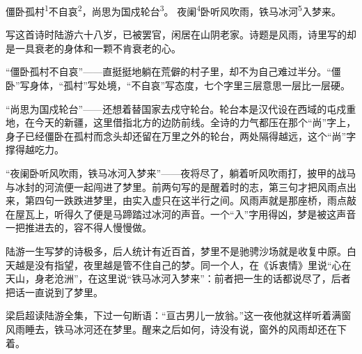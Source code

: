 
\begin{poem}
僵卧孤村\textsuperscript{1}不自哀\textsuperscript{2}，尚思为国戍轮台\textsuperscript{3}。
夜阑\textsuperscript{4}卧听风吹雨，铁马冰河\textsuperscript{5}入梦来。
\end{poem}

\begin{annotations}
\end{annotations}

\begin{appreciation}
写这首诗时陆游六十八岁，已被罢官，闲居在山阴老家。诗题是风雨，诗里写的却是一具衰老的身体和一颗不肯衰老的心。

“僵卧孤村不自哀”——直挺挺地躺在荒僻的村子里，却不为自己难过半分。“僵卧”写身体，“孤村”写处境，“不自哀”写态度，七个字里三层意思一层比一层硬。

“尚思为国戍轮台”——还想着替国家去戍守轮台。轮台本是汉代设在西域的屯戍重地，在今天的新疆，这里借指北方的边防前线。全诗的力气都压在那个“尚”字上，身子已经僵卧在孤村而念头却还留在万里之外的轮台，两处隔得越远，这个“尚”字撑得越吃力。

“夜阑卧听风吹雨，铁马冰河入梦来”——夜将尽了，躺着听风吹雨打，披甲的战马与冰封的河流便一起闯进了梦里。前两句写的是醒着时的志，第三句才把风雨点出来，第四句一跌跌进梦里，由实入虚只在这半行之间。风雨声就是那座桥，雨点敲在屋瓦上，听得久了便是马蹄踏过冰河的声音。一个“入”字用得凶，梦是被这声音一把推进去的，容不得人慢慢做。

陆游一生写梦的诗极多，后人统计有近百首，梦里不是驰骋沙场就是收复中原。白天越是没有指望，夜里越是管不住自己的梦。同一个人，在《诉衷情》里说“心在天山，身老沧洲”，在这里说“铁马冰河入梦来”：前者把一生的话都说尽了，后者把话一直说到了梦里。

梁启超读陆游全集，下过一句断语：“亘古男儿一放翁。”这一夜他就这样听着满窗风雨睡去，铁马冰河还在梦里。醒来之后如何，诗没有说，窗外的风雨却还在下着。
\end{appreciation}
